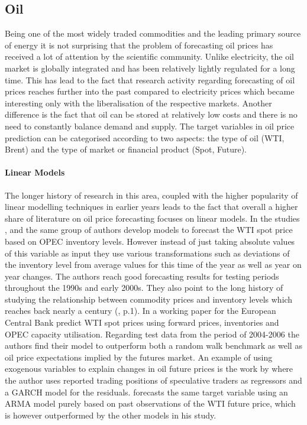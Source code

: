 \subsection{Oil}
Being one of the most widely traded commodities and the leading primary source of energy it is not surprising that the problem of forecasting oil prices has received a lot of attention by the scientific community. Unlike electricity, the oil market is  globally integrated and has been relatively lightly regulated for a long time.
This has lead to the fact that research activity regarding forecasting of oil prices reaches further into the past compared to electricity prices which became interesting only with the liberalisation of the respective markets.
Another difference is the fact that oil can be stored at relatively low costs and there is no need to constantly balance demand and supply. The target variables in oil price prediction can be categorised according to two aspects: the type of oil (WTI, Brent) and the type of market or financial product (Spot, Future). 

\paragraph{Linear Models}
The longer history of research in this area, coupled with the higher popularity of linear modelling techniques in earlier years leads to the fact that overall a higher share of literature on oil price forecasting focuses on linear models. In the studies \cite{ye_forecasting_2002}, \cite{ye_monthly_2005} and \cite{ye_forecasting_2006} the same group of authors develop models to forecast the WTI spot price based on OPEC inventory levels. However instead of just taking absolute values of this variable as input they use various transformations such as deviations of the inventory level from average values for this time of the year as well as year on year changes.  The authors reach good forecasting results for testing periods throughout the 1990s and early 2000s. They also point to the long history of studying the relationship between commodity prices and inventory levels which reaches back nearly a century (\cite{ye_forecasting_2006}, p.1).
In a working paper for the European Central Bank \cite{dees_assessing_2008} predict WTI spot prices using forward prices, inventories and OPEC capacity utilisation. Regarding test data from the period of 2004-2006 the authors find their model to outperform both a random walk benchmark as well as oil price expectations implied by the futures market. An example of using exogenous variables to explain changes in oil future prices is the work by \cite{bu_price_2011} where the author uses reported trading positions of speculative traders as regressors and a GARCH model for the residuals. \cite{moshiri_forecasting_2006} forecasts the same target variable using an ARMA  model purely based on past observations of the WTI future price, which is however outperformed by the other models in his study. 

